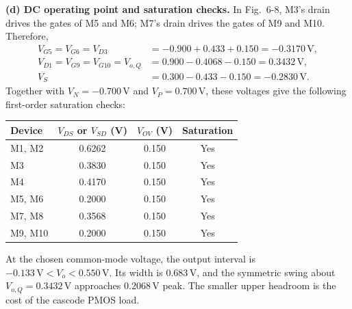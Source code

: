 \documentclass[12pt,letterpaper]{article}
\newcommand{\V}{\,\mathrm{V}}
\begin{document}
\begin{enumerate}
\newpage
\textbf{(d) DC operating point and saturation checks.}
In Fig.~6-8, M3's drain drives the gates of M5 and M6; M7's
drain drives the gates of M9 and M10. Therefore,
\begin{align*}
V_{G5}=V_{G6}=V_{D3}&=-0.900+0.433+0.150=-0.3170\V,\\
V_{D1}=V_{G9}=V_{G10}=V_{o,Q}&=0.900-0.4068-0.150=0.3432\V,\\
V_S&=0.300-0.433-0.150=-0.2830\V.
\end{align*}
Together with $V_N=-0.700\V$ and $V_P=0.700\V$, these
voltages give the following first-order saturation checks:
\begin{center}
\small
\begin{tabular}{@{}lccc@{}}
\toprule
Device & $V_{DS}$ or $V_{SD}$ (V) & $V_{OV}$ (V) & Saturation\\
\midrule
M1, M2 & 0.6262 & 0.150 & Yes\\
M3 & 0.3830 & 0.150 & Yes\\
M4 & 0.4170 & 0.150 & Yes\\
M5, M6 & 0.2000 & 0.150 & Yes\\
M7, M8 & 0.3568 & 0.150 & Yes\\
M9, M10 & 0.2000 & 0.150 & Yes\\
\bottomrule
\end{tabular}
\end{center}
At the chosen common-mode voltage, the output interval is
$-0.133\V<V_o<0.550\V$. Its width is $0.683\V$, and
the symmetric swing about $V_{o,Q}=0.3432\V$ approaches
$0.2068\V$ peak. The smaller upper headroom is the cost of
the cascode PMOS load.


\end{enumerate}
\end{document}
